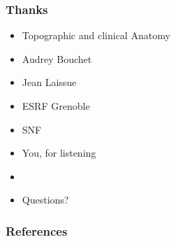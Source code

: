 \documentclass{beamer}
\begin{document}
\begin{frame}
	\frametitle{Thanks}
	\begin{itemize}
		\item Topographic and clinical Anatomy
		\item Audrey Bouchet
		\item Jean Laissue
		\item ESRF Grenoble
		\item SNF
		\pause
		\item You, for listening
		\item[]
		\pause
		\item Questions?
	\end{itemize}
\end{frame}

\begin{frame}[allowframebreaks]
	\frametitle{References}
	\renewcommand*{\bibfont}{\scriptsize}
	\printbibliography
\end{frame}
\end{document}
